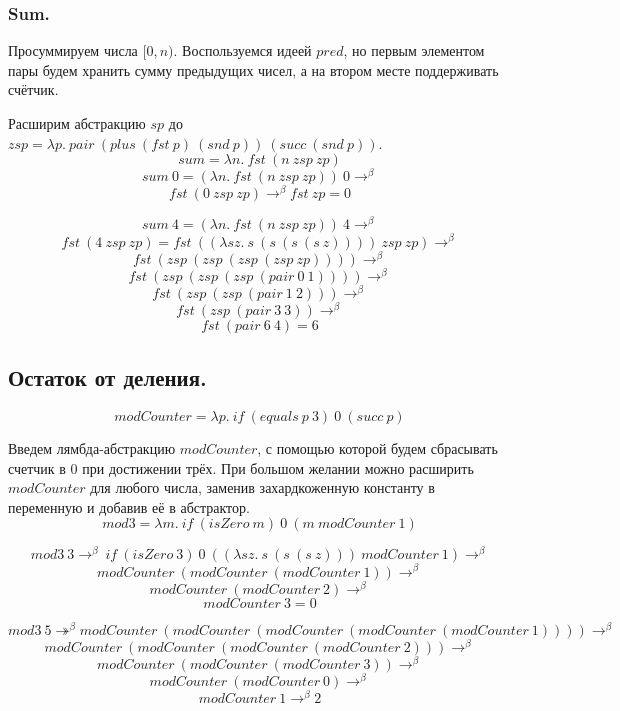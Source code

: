 \documentclass[a4paper,12pt]{article}
\theoremstyle{plain} %
\theoremstyle{definition} %
\theoremstyle{remark} %
\begin{document}
\subsubsection{Sum.}
Просуммируем числа $[0, n)$. Воспользуемся идеей $pred$, но первым элементом пары будем хранить сумму предыдущих чисел, а на втором месте поддерживать счётчик. 

Расширим абстракцию $sp$ до $zsp = \lambda p. \ pair \ (plus \ (fst \ p) \ (snd \ p)) \ (succ \ (snd \ p))$. 
$$sum = \lambda n. \ fst \ (n \ zsp \ zp) $$
$$sum \ 0 = (\lambda n. \ fst \ (n \ zsp \ zp)) \ 0 \rightarrow^{\beta}$$
$$fst \ (0 \ zsp \ zp) \rightarrow^{\beta} fst \ zp = 0$$

$$sum \ 4 = (\lambda n. \ fst \ (n \ zsp \ zp)) \ 4 \rightarrow^{\beta}$$
$$fst \ (4 \ zsp \ zp) = fst \ ((\lambda sz. \ s \ (s \ (s \ (s \ z)))) \ zsp \ zp) \rightarrow^{\beta}$$
$$fst \ (zsp \ (zsp \ (zsp \ (zsp \ zp)))) \rightarrow^{\beta}$$
$$fst \ (zsp \ (zsp \ (zsp \ (pair \ 0 \ 1)))) \rightarrow^{\beta}$$
$$fst \ (zsp \ (zsp \ (pair \ 1 \ 2))) \rightarrow^{\beta}$$
$$fst \ (zsp \ (pair \ 3 \ 3)) \rightarrow^{\beta}$$
$$fst \ (pair \ 6 \ 4) = 6$$

\subsection{Остаток от деления.}
$$modCounter = \lambda p. \ if \ (equals \ p \ 3) \ 0 \ (succ \ p)$$

Введем лямбда-абстракцию $modCounter$, с помощью которой будем сбрасывать счетчик в $0$ при достижении трёх. При большом желании можно расширить $modCounter$ для любого числа, заменив захардкоженную константу в переменную и добавив её в абстрактор.
$$mod3 = \lambda m. \ if  \ (isZero \ m) \ 0 \ (m \ modCounter \ 1)$$

$$mod3 \ 3 \rightarrow^{\beta} \ if \ (isZero \ 3) \ 0 \ ((\lambda sz. \ s \ (s \ (s \ z))) \ modCounter \ 1) \rightarrow^{\beta}$$
$$modCounter \ (modCounter \ (modCounter \ 1)) \rightarrow^{\beta}$$
$$modCounter \ (modCounter \ 2) \rightarrow^{\beta}$$
$$modCounter \ 3 = 0 $$

$$mod3 \ 5 \twoheadrightarrow^{\beta} modCounter \ (modCounter \ (modCounter \ (modCounter \ (modCounter \ 1)))) \rightarrow^{\beta}$$
$$modCounter \ (modCounter \ (modCounter \ (modCounter \ 2))) \rightarrow^{\beta}$$
$$modCounter \ (modCounter \ (modCounter \ 3)) \rightarrow^{\beta}$$
$$modCounter \ (modCounter \ 0) \rightarrow^{\beta}$$
$$modCounter \ 1 \rightarrow^{\beta} 2$$
\end{document}
